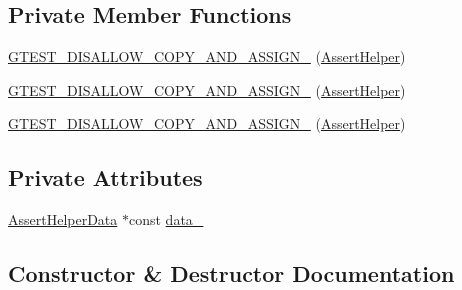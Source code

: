 \subsection*{Private Member Functions}
\begin{DoxyCompactItemize}
\item 
\mbox{\hyperlink{classtesting_1_1internal_1_1_assert_helper_a264544ac41950b296c34253d2e656b10}{G\+T\+E\+S\+T\+\_\+\+D\+I\+S\+A\+L\+L\+O\+W\+\_\+\+C\+O\+P\+Y\+\_\+\+A\+N\+D\+\_\+\+A\+S\+S\+I\+G\+N\+\_\+}} (\mbox{\hyperlink{classtesting_1_1internal_1_1_assert_helper}{Assert\+Helper}})
\item 
\mbox{\hyperlink{classtesting_1_1internal_1_1_assert_helper_a264544ac41950b296c34253d2e656b10}{G\+T\+E\+S\+T\+\_\+\+D\+I\+S\+A\+L\+L\+O\+W\+\_\+\+C\+O\+P\+Y\+\_\+\+A\+N\+D\+\_\+\+A\+S\+S\+I\+G\+N\+\_\+}} (\mbox{\hyperlink{classtesting_1_1internal_1_1_assert_helper}{Assert\+Helper}})
\item 
\mbox{\hyperlink{classtesting_1_1internal_1_1_assert_helper_a264544ac41950b296c34253d2e656b10}{G\+T\+E\+S\+T\+\_\+\+D\+I\+S\+A\+L\+L\+O\+W\+\_\+\+C\+O\+P\+Y\+\_\+\+A\+N\+D\+\_\+\+A\+S\+S\+I\+G\+N\+\_\+}} (\mbox{\hyperlink{classtesting_1_1internal_1_1_assert_helper}{Assert\+Helper}})
\end{DoxyCompactItemize}
\subsection*{Private Attributes}
\begin{DoxyCompactItemize}
\item 
\mbox{\hyperlink{structtesting_1_1internal_1_1_assert_helper_1_1_assert_helper_data}{Assert\+Helper\+Data}} $\ast$const \mbox{\hyperlink{classtesting_1_1internal_1_1_assert_helper_aa6a32ec28727fdf56d95c38f739b2254}{data\+\_\+}}
\end{DoxyCompactItemize}


\subsection{Constructor \& Destructor Documentation}
\mbox{\label{classtesting_1_1internal_1_1_assert_helper_ac2c9334518fd4087189b4505567a3c90}} 
